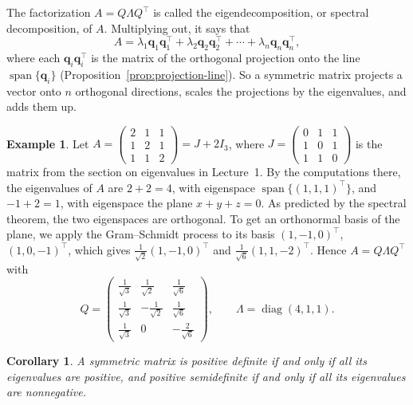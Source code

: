 \documentclass[11pt]{article}
\theoremstyle{definition}
\newtheorem{example}[definition]{Example}
\theoremstyle{plain}
\newtheorem{corollary}[definition]{Corollary}
\theoremstyle{remark}
\DeclareMathOperator{\Span}{span}
\DeclareMathOperator{\diag}{diag}
\begin{document}
The factorization $A = Q\Lambda Q^\top$ is called the eigendecomposition, or spectral decomposition, of $A$. Multiplying out, it says that
\[A = \lambda_1 \mathbf{q}_1 \mathbf{q}_1^\top + \lambda_2 \mathbf{q}_2 \mathbf{q}_2^\top + \cdots + \lambda_n \mathbf{q}_n \mathbf{q}_n^\top,\]
where each $\mathbf{q}_i \mathbf{q}_i^\top$ is the matrix of the orthogonal projection onto the line $\Span\{\mathbf{q}_i\}$ (Proposition~\ref{prop:projection-line}). So a symmetric matrix projects a vector onto $n$ orthogonal directions, scales the projections by the eigenvalues, and adds them up.

\begin{example}\label{ex:spectral}
    Let $A = \begin{pmatrix} 2 & 1 & 1 \\ 1 & 2 & 1 \\ 1 & 1 & 2 \end{pmatrix} = J + 2I_3$, where $J = \begin{pmatrix} 0 & 1 & 1 \\ 1 & 0 & 1 \\ 1 & 1 & 0 \end{pmatrix}$ is the matrix from the section on eigenvalues in Lecture~1. By the computations there, the eigenvalues of $A$ are $2 + 2 = 4$, with eigenspace $\Span\{(1, 1, 1)^\top\}$, and $-1 + 2 = 1$, with eigenspace the plane $x + y + z = 0$. As predicted by the spectral theorem, the two eigenspaces are orthogonal. To get an orthonormal basis of the plane, we apply the Gram--Schmidt process to its basis $(1, -1, 0)^\top$, $(1, 0, -1)^\top$, which gives $\frac{1}{\sqrt{2}}(1, -1, 0)^\top$ and $\frac{1}{\sqrt{6}}(1, 1, -2)^\top$. Hence $A = Q\Lambda Q^\top$ with
    \[Q = \begin{pmatrix} \frac{1}{\sqrt{3}} & \frac{1}{\sqrt{2}} & \frac{1}{\sqrt{6}} \\ \frac{1}{\sqrt{3}} & -\frac{1}{\sqrt{2}} & \frac{1}{\sqrt{6}} \\ \frac{1}{\sqrt{3}} & 0 & -\frac{2}{\sqrt{6}} \end{pmatrix}, \qquad \Lambda = \diag(4, 1, 1).\]
\end{example}

\begin{corollary}\label{cor:spd-eigenvalues}
    A symmetric matrix is positive definite if and only if all its eigenvalues are positive, and positive semidefinite if and only if all its eigenvalues are nonnegative.
\end{corollary}
\end{document}
